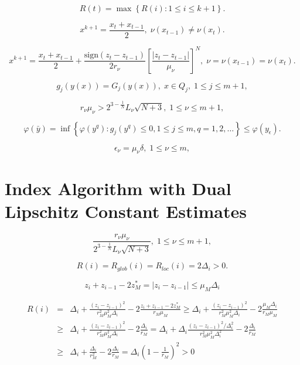 \documentclass[review]{elsarticle}
\begin{document}
\begin{equation}\label{MaxR}
	R(t)=\max{\left\{R(i): 1 \leq i \leq k+1\right\}}.
\end{equation}

\[
	x^{k+1} = \frac{x_t + x_{t-1}}{2}, \; \nu(x_{t-1}) \neq \nu(x_t).
\]

\[
	x^{k+1} = \frac{x_t+x_{t-1}}{2} + \frac{\mathrm{sign}(z_t-z_{t-1})}{2r_\nu}\left[\frac{\left|z_t-z_{t-1}\right|}{\mu_\nu}\right]^N, \; \nu=\nu(x_{t-1})=\nu(x_t).
\]

\[
	g_j \left( y(x) \right) = G_j \left( y(x) \right), \; x \in Q_j, \; 1 \leq j \leq m+1,
\]

\begin{equation}\label{theorem_inequalities}
	r_{\nu}\mu_{\nu} > 2^{3-\frac{1}{N}}L_{\nu}\sqrt{N+3}, \; 1 \leq \nu \leq m+1, 
\end{equation}

\[
	\varphi(\bar y) = \inf\left\{\varphi(y^q):g_j(y^q) \leq 0, 1 \leq j \leq m, q = 1,2,\ldots \right\} \leq \varphi(y_{\epsilon}).
\]

\begin{equation}\label{epsilon_nu}
	\epsilon_{\nu} = \mu_{\nu}\delta, \; 1 \leq \nu \leq m, 
\end{equation}


\section{Index Algorithm with Dual Lipschitz Constant Estimates}

\begin{equation}\label{estimates_Lipschitz_constants}
	\frac{r_{\nu}\mu_{\nu}}{2^{3-\frac{1}{N}}L_{\nu}\sqrt{N+3}}, \; 1 \leq \nu \leq m+1, 
\end{equation}

\begin{equation}\label{R_glob_1}
	R(i)=R_{glob}(i)=R_{loc}(i)=2\Delta_i>0. 
\end{equation}

\[
	z_i+z_{i-1}-2z_M^* = |z_i-z_{i-1}|\leq \mu_M\Delta_i
\]

\begin{eqnarray}
	R(i) & = & \Delta_i + \frac{(z_i-z_{i-1})^2}{r_M^2\mu_M^2\Delta_i} - 2\frac{z_i+z_{i-1}-2z_M^*}{r_M\mu_M} \geq \Delta_i + \frac{(z_i-z_{i-1})^2}{r_M^2\mu_M^2\Delta_i} - 2\frac{\mu_M\Delta_i}{r_M\mu_M} \nonumber \\
	& \geq & \Delta_i + \frac{(z_i-z_{i-1})^2}{r_M^2\mu_M^2\Delta_i} - 2\frac{\Delta_i}{r_M} = \Delta_i + \Delta_i\frac{(z_i-z_{i-1})^2/\Delta_i^2}{r_M^2\mu_M^2\Delta_i^2} - 2\frac{\Delta_i}{r_M}
\nonumber \\
	& \geq & \Delta_i + \frac{\Delta_i}{r_M^2} - 2\frac{\Delta_i}{r_M} = \Delta_i \left( 1-\frac{1}{r_M} \right)^2>0  
	\nonumber
\end{eqnarray}
\end{document}
